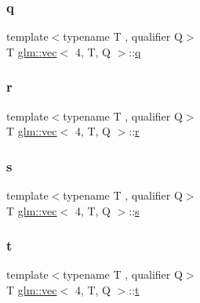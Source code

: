 \subsubsection{\texorpdfstring{q}{q}}
{\footnotesize\ttfamily template$<$typename T , qualifier Q$>$ \\
T \hyperlink{structglm_1_1vec}{glm\+::vec}$<$ 4, T, Q $>$\+::\hyperlink{_s_d_l__opengl_8h_a8fc1e7b9baaae687804c7eed46ca09c6}{q}}

\mbox{\label{structglm_1_1vec_3_014_00_01_t_00_01_q_01_4_a2b985b974ca60ce93681865d0251adbd}} 
\subsubsection{\texorpdfstring{r}{r}}
{\footnotesize\ttfamily template$<$typename T , qualifier Q$>$ \\
T \hyperlink{structglm_1_1vec}{glm\+::vec}$<$ 4, T, Q $>$\+::\hyperlink{_s_d_l__opengl_8h_a42ce7cdc612e53abee15043f80220d97}{r}}

\mbox{\label{structglm_1_1vec_3_014_00_01_t_00_01_q_01_4_af72c3f5a2b95f3b81b0b3a751b260fe7}} 
\subsubsection{\texorpdfstring{s}{s}}
{\footnotesize\ttfamily template$<$typename T , qualifier Q$>$ \\
T \hyperlink{structglm_1_1vec}{glm\+::vec}$<$ 4, T, Q $>$\+::\hyperlink{_s_d_l__opengl_8h_a4af680a6c683f88ed67b76f207f2e6e4}{s}}

\mbox{\label{structglm_1_1vec_3_014_00_01_t_00_01_q_01_4_ab022af720f5053ff65c7ea8688289ce1}} 
\subsubsection{\texorpdfstring{t}{t}}
{\footnotesize\ttfamily template$<$typename T , qualifier Q$>$ \\
T \hyperlink{structglm_1_1vec}{glm\+::vec}$<$ 4, T, Q $>$\+::\hyperlink{_s_d_l__opengl_8h_a7d65d00ca3b0630d9b5c52df855b19f5}{t}}

